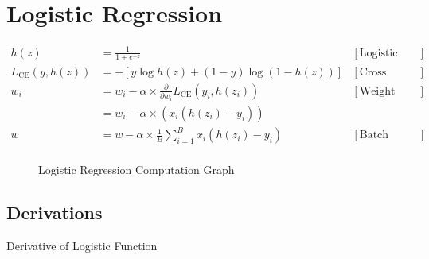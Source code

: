 \section{Logistic Regression}

\begin{align*}
    h(z) &= \frac{1}{1 + e^{-z}} & [\text{Logistic Function}] \\
    L_{\text{CE}}(y, h(z)) &= -\left[y\log h(z) + (1-y)\log(1-h(z))\right] & [\text{Cross Entropy Loss}] \\
    w_i &= w_i - \alpha \times \frac{\partial}{\partial w_i} L_{\text{CE}}(y_i, h(z_i)) & [\text{Weight Update}]\\
    &= w_i - \alpha \times (x_i (h(z_i) - y_i)) \\
    w &= w - \alpha \times \frac{1}{B}\sum^{B}_{i=1} x_i (h(z_i) - y_i) & [\text{Batch Weight Update}]\\
\end{align*}

\begin{figure}[h]
    \centering
    \caption{Logistic Regression Computation Graph}
\end{figure}

\subsection{Derivations}
Derivative of Logistic Function\\

